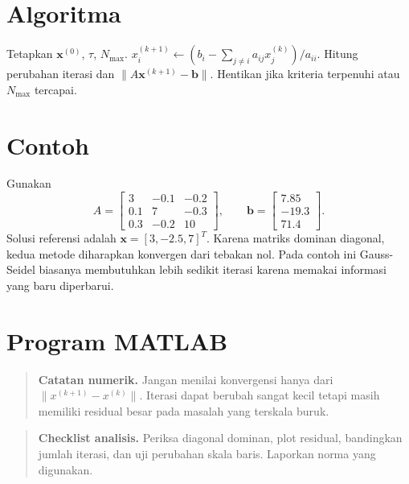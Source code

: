 \documentclass[book,english,noindex,lean,nobackpage,nocopyright,noupdate,nofiglist,notablist]{enacom}
\newcommand{\Note}[1]{\begin{quote}\textbf{Catatan numerik.} #1\end{quote}}
\newcommand{\AnalysisCheck}[1]{\begin{quote}\textbf{Checklist analisis.} #1\end{quote}}
\begin{document}
\section{Algoritma}
\begin{algorithm}
\caption{Jacobi untuk $A\mathbf{x}=\mathbf{b}$}
\begin{algorithmic}[1]
\State Tetapkan $\mathbf{x}^{(0)}$, $\tau$, $N_{\max}$.
\State $x_i^{(k+1)}\gets\left(b_i-\sum_{j\ne i}a_{ij}x_j^{(k)}\right)/a_{ii}$.
\EndFor
\State Hitung perubahan iterasi dan $\|A\mathbf{x}^{(k+1)}-\mathbf{b}\|$.
\State Hentikan jika kriteria terpenuhi atau $N_{\max}$ tercapai.
\EndFor
\end{algorithmic}
\end{algorithm}

\section{Contoh}
Gunakan
\begin{equation}
A=\begin{bmatrix}3&-0.1&-0.2\\0.1&7&-0.3\\0.3&-0.2&10\end{bmatrix},\qquad
\mathbf{b}=\begin{bmatrix}7.85\\-19.3\\71.4\end{bmatrix}.
\end{equation}
Solusi referensi adalah $\mathbf{x}=[3,-2.5,7]^T$. Karena matriks dominan diagonal, kedua metode diharapkan konvergen dari tebakan nol. Pada contoh ini Gauss-Seidel biasanya membutuhkan lebih sedikit iterasi karena memakai informasi yang baru diperbarui.

\section{Program MATLAB}




\Note{Jangan menilai konvergensi hanya dari $\|x^{(k+1)}-x^{(k)}\|$. Iterasi dapat berubah sangat kecil tetapi masih memiliki residual besar pada masalah yang terskala buruk.}
\AnalysisCheck{Periksa diagonal dominan, plot residual, bandingkan jumlah iterasi, dan uji perubahan skala baris. Laporkan norma yang digunakan.}
\end{document}
